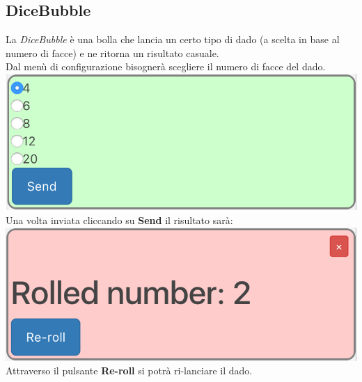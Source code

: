\subsection{DiceBubble}
La \textit{DiceBubble} è una bolla che lancia un certo tipo di dado (a scelta in base al numero di facce) e ne ritorna un risultato casuale.\\
Dal menù di configurazione bisognerà scegliere il numero di facce del dado.\\

\includegraphics[scale=0.75]{img/randConfig.png}
\\
Una volta inviata cliccando su \textbf{Send} il risultato sarà:\\

\includegraphics[scale=0.75]{img/rand.png}
\\
Attraverso il pulsante \textbf{Re-roll} si potrà ri-lanciare il dado.